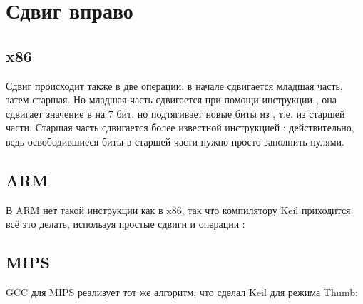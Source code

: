 ﻿\section{Сдвиг вправо}



\subsection{x86}



\ifdefined\IncludeGCC

\fi

Сдвиг происходит также в две операции: в начале сдвигается младшая часть, затем старшая.
Но младшая часть сдвигается при помощи инструкции , она сдвигает значение в \EDX{} на 7 бит, но подтягивает новые биты из \EAX{}, т.е. из старшей части.
Старшая часть сдвигается более известной инструкцией \SHR{}: действительно, ведь освободившиеся биты в старшей части нужно
просто заполнить нулями.

\ifdefined\IncludeARM
\subsection{ARM}

В ARM нет такой инструкции как  в x86, так что компилятору Keil приходится всё это делать,
используя простые сдвиги и операции :




\fi

\ifdefined\IncludeMIPS
\subsection{MIPS}

\ifdefined\IncludeGCC

GCC для MIPS реализует тот же алгоритм, что сделал Keil для режима Thumb:


\fi

\fi

